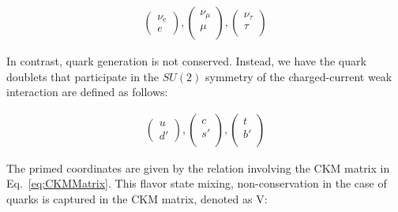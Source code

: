 \begin{equation} 
\begin{align*}
\label{eq:CKMMatrix}
        \begin{pmatrix}
        \nu_e \\
        e 
    \end{pmatrix}, 
    \begin{pmatrix}
         \nu_\mu \\
         \mu \\
    \end{pmatrix},
     \begin{pmatrix}
        \nu_\tau \\
        \tau \\
    \end{pmatrix}
\end{align*}
\end{equation}

In contrast, quark generation is not conserved. Instead, we have the quark doublets that participate in the $SU(2)$ symmetry of the charged-current weak interaction are defined as follows:

\begin{equation} 
\begin{align*}
\label{eq:CKMMatrix}
        \begin{pmatrix}
        u \\
        d' 
    \end{pmatrix}, 
    \begin{pmatrix}
         c \\
         s' \\
    \end{pmatrix},
     \begin{pmatrix}
        t \\
        b' \\
    \end{pmatrix}
\end{align*}
\end{equation}

The primed coordinates are given by the relation involving the CKM matrix in Eq.~\ref{eq:CKMMatrix}. This flavor state mixing, non-conservation in the case of quarks is captured in the CKM matrix, denoted as V: 

